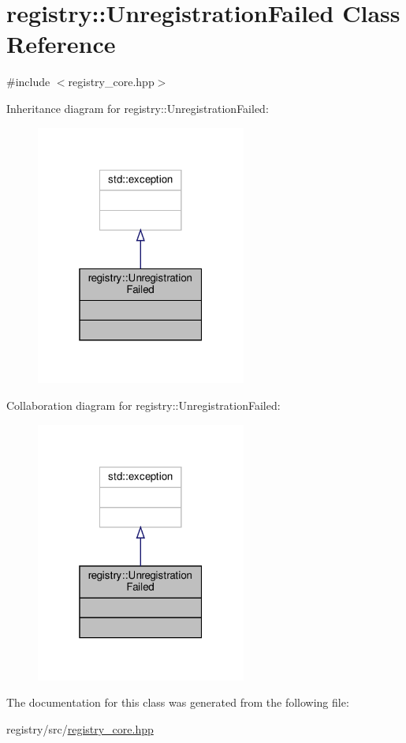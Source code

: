 \hypertarget{classregistry_1_1UnregistrationFailed}{}\section{registry\+:\+:Unregistration\+Failed Class Reference}
\label{classregistry_1_1UnregistrationFailed}


{\ttfamily \#include $<$registry\+\_\+core.\+hpp$>$}



Inheritance diagram for registry\+:\+:Unregistration\+Failed\+:\nopagebreak
\begin{figure}[H]
\begin{center}
\leavevmode
\includegraphics[width=196pt]{classregistry_1_1UnregistrationFailed__inherit__graph}
\end{center}
\end{figure}


Collaboration diagram for registry\+:\+:Unregistration\+Failed\+:\nopagebreak
\begin{figure}[H]
\begin{center}
\leavevmode
\includegraphics[width=196pt]{classregistry_1_1UnregistrationFailed__coll__graph}
\end{center}
\end{figure}


The documentation for this class was generated from the following file\+:\begin{DoxyCompactItemize}
\item 
registry/src/\hyperlink{registry__core_8hpp}{registry\+\_\+core.\+hpp}\end{DoxyCompactItemize}
